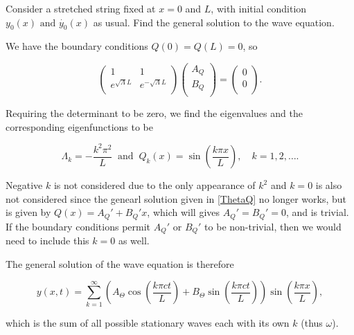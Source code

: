 \documentclass[a4paper,12pt]{report}
\begin{document}
{Consider a stretched string fixed at \(x=0\) and \(L\), with initial condition \(y_0 (x) \text { and }  \dot{y_0 }(x) \) as usual. Find the general solution to the wave equation. }
{We have the boundary conditions \(Q(0) = Q(L) = 0\), so

\begin{equation}
	\begin{pmatrix}
		1 &  1 \\
		e^{\sqrt{\Lambda }L }  & e^{-\sqrt{\Lambda }L }   \\
	\end{pmatrix} \begin{pmatrix}
		 A_{Q}  \\
		 B_{Q}  \\
	\end{pmatrix} = \begin{pmatrix}
		 0 \\
		 0 \\
	\end{pmatrix}.
\end{equation}

Requiring the determinant to be zero, we find the eigenvalues and the corresponding eigenfunctions to be

\begin{equation}
	\Lambda_{k} = -\frac{k^2 \pi ^2}{L} ~\text { and }~ Q_{k}(x) = \sin \left( \frac{k\pi x}{L}  \right), \quad   k = 1,2,\ldots . 
\end{equation}

Negative \(k\) is not considered due to the only appearance of \(k^2\) and \(k=0\) is also not considered since the genearl solution given in \cref{ThetaQ} no longer works, but is given by \(Q(x) = A_{Q}' + B_{Q}'x  \), which will gives \(A_{Q}' = B_{Q}' = 0\), and is trivial. If the boundary conditions permit \(A_{Q}' \text { or }  B_{Q}' \) to be non-trivial, then we would need to include this \(k=0\) as well. 

The general solution of the wave equation is therefore

\begin{equation}
	y(x,t) = \sum_{k=1}^{\infty}\left( A_{\Theta }\cos \left( \frac{k \pi ct}{L}  \right) + B_{\Theta } \sin \left( \frac{k \pi ct}{L}  \right)  \right) \sin \left( \frac{k \pi x}{L}  \right),
\end{equation}

which is the sum of all possible stationary waves each with its own \(k\) (thus \(\omega \)).

}
\end{document}
